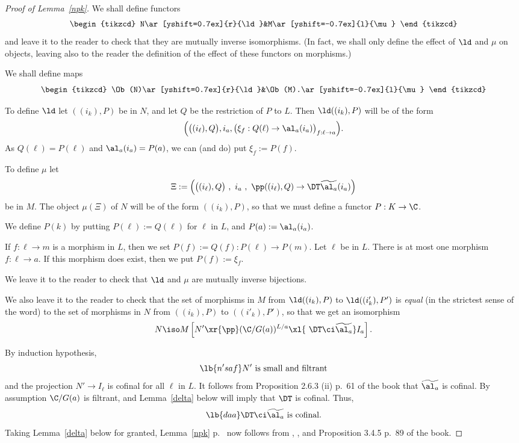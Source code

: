 \documentclass[12pt]{article}
\theoremstyle{remark}
\theoremstyle{definition}
\begin{document}
\begin{proof}[Proof of Lemma~\ref{npk}]
We shall define functors 
$$
\begin{tikzcd}
N\ar[yshift=0.7ex]{r}{\ld}&M\ar[yshift=-0.7ex]{l}{\mu}
\end{tikzcd}
$$ 
and leave it to the reader to check that they are mutually inverse isomorphisms. (In fact, we shall only define the effect of $\ld$ and $\mu$ on objects, leaving also to the reader the definition of the effect of these functors on morphisms.)

We shall define maps 
$$
\begin{tikzcd}
\Ob(N)\ar[yshift=0.7ex]{r}{\ld}&\Ob(M).\ar[yshift=-0.7ex]{l}{\mu}
\end{tikzcd}
$$ 

To define $\ld$ let $((i_k),P)$ be in $N$, and let $Q$ be the restriction of $P$ to $L$. Then $\ld((i_k),P)$ will be of the form 
$$
\Big(\big((i_\ell),Q\big),i_a,\big(\xi_f:Q(\ell)\to\al_a(i_a)\big)_{f:\ell\to a}\Big).
$$ 
As $Q(\ell)=P(\ell)$ and $\al_a(i_a)=P(a)$, we can (and do) put $\xi_f:=P(f)$. 

To define $\mu$ let 
$$
\Xi:=\Big(\big((i_\ell),Q\big)\ ,\ i_a\ ,\ \pp((i_\ell),Q)\to\DT\widetilde{\al_a}(i_a)\Big)
$$ 
be in $M$. The object $\mu(\Xi)$ of $N$ will be of the form $((i_k),P)$, so that we must define a functor $P:K\to\C$. 

We define $P(k)$ by putting $P(\ell):=Q(\ell)$ for $\ell$ in $L$, and $P(a):=\al_a(i_a)$. 

If $f:\ell\to m$ is a morphism in $L$, then we set $P(f):=Q(f):P(\ell)\to P(m)$. Let $\ell$ be in $L$. There is at most one morphism $f:\ell\to a$. If this morphism does exist, then we put $P(f):=\xi_f$. 

We leave it to the reader to check that $\ld$ and $\mu$ are mutually inverse bijections. 

We also leave it to the reader to check that the set of morphisms in $M$ from $\ld((i_k),P)$ to $\ld((i'_k),P')$ is \emph{equal} (in the strictest sense of the word) to the set of morphisms in $N$ from $((i_k),P)$ to $((i'_k),P')$, so that we get an isomorphism 
$$ 
N\iso M\left[N'\xr{\pp}(\C/G(a))^{L/a}\xl{\ \DT\ci\widetilde{\al_a}}I_a\right]. 
$$

By induction hypothesis, 
%
\begin{equation}\lb{n'saf}
N'\text{ is small and filtrant}
\end{equation} 
%
and the projection $N'\to I_\ell$ is cofinal for all $\ell$ in $L$. It follows from Proposition 2.6.3 (ii) p.~61 of the book that $\widetilde{\al_a}$ is cofinal. By assumption $\C/G(a)$ is filtrant, and Lemma~\ref{delta} below will imply that $\DT$ is cofinal. Thus, 
%
\begin{equation}\lb{daa}
\DT\ci\widetilde{\al_a}\text{ is cofinal.}
\end{equation} 
% 
Taking Lemma~\ref{delta} below for granted, Lemma~\ref{npk} p.~ now follows from , , and Proposition 3.4.5 p.~89 of the book. 
\end{proof} 
\end{document}
